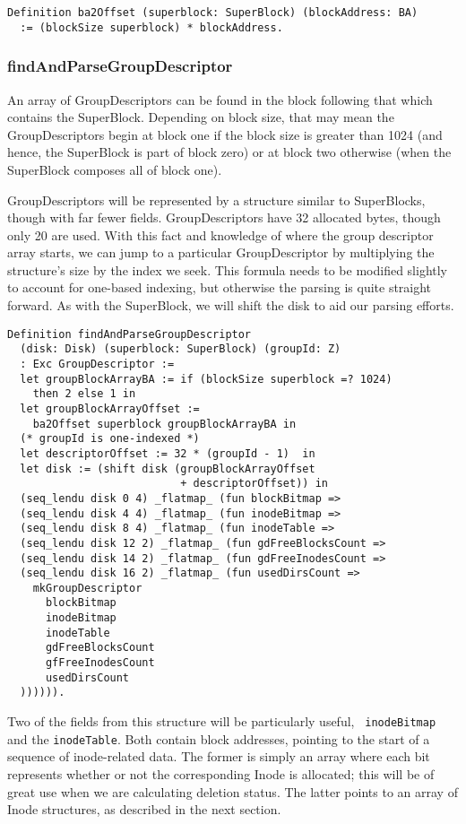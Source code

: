 \documentclass[nocopyrightspace]{sigplanconf}
\begin{document}
\begin{lstlisting}
Definition ba2Offset (superblock: SuperBlock) (blockAddress: BA)
  := (blockSize superblock) * blockAddress.
\end{lstlisting}

\subsubsection{findAndParseGroupDescriptor}
An array of GroupDescriptors can be found in the block following that which
contains the SuperBlock. Depending on block size, that may mean the
GroupDescriptors begin at block one if the block size is greater than 1024
(and hence, the SuperBlock is part of block zero) or at block two otherwise
(when the SuperBlock composes all of block one). 

GroupDescriptors will be represented by a structure similar to SuperBlocks,
though with far fewer fields. GroupDescriptors have 32 allocated bytes, though
only 20 are used. With this fact and knowledge of where the group descriptor
array starts, we can jump to a particular GroupDescriptor by multiplying the
structure's size by the index we seek. This formula needs to be modified
slightly to account for one-based indexing, but otherwise the parsing is quite
straight forward. As with the SuperBlock, we will shift the disk to aid our
parsing efforts. 

\begin{lstlisting}
Definition findAndParseGroupDescriptor 
  (disk: Disk) (superblock: SuperBlock) (groupId: Z)
  : Exc GroupDescriptor :=
  let groupBlockArrayBA := if (blockSize superblock =? 1024)
    then 2 else 1 in
  let groupBlockArrayOffset := 
    ba2Offset superblock groupBlockArrayBA in
  (* groupId is one-indexed *)
  let descriptorOffset := 32 * (groupId - 1)  in
  let disk := (shift disk (groupBlockArrayOffset 
                           + descriptorOffset)) in
  (seq_lendu disk 0 4) _flatmap_ (fun blockBitmap =>
  (seq_lendu disk 4 4) _flatmap_ (fun inodeBitmap =>
  (seq_lendu disk 8 4) _flatmap_ (fun inodeTable =>
  (seq_lendu disk 12 2) _flatmap_ (fun gdFreeBlocksCount =>
  (seq_lendu disk 14 2) _flatmap_ (fun gdFreeInodesCount =>
  (seq_lendu disk 16 2) _flatmap_ (fun usedDirsCount =>
    mkGroupDescriptor
      blockBitmap
      inodeBitmap
      inodeTable
      gdFreeBlocksCount
      gfFreeInodesCount
      usedDirsCount
  )))))).
\end{lstlisting}

Two of the fields from this structure will be particularly useful, {\tt
inodeBitmap} and the {\tt inodeTable}. Both contain block addresses, pointing
to the start of a sequence of inode-related data. The former is simply an
array where each bit represents whether or not the corresponding Inode is
allocated; this will be of great use when we are calculating deletion status.
The latter points to an array of Inode structures, as described in the next
section.
\end{document}
